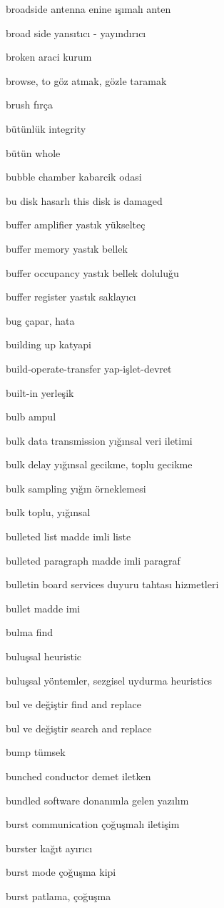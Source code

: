 \documentclass[12pt,fleqn]{article}\usepackage{../../common}
\begin{document}
broadside antenna enine ışımalı anten

broad side yansıtıcı - yayındırıcı

broken araci kurum

browse, to göz atmak, gözle taramak

brush fırça

bütünlük integrity

bütün whole

bubble chamber kabarcik odasi

bu disk hasarlı this disk is damaged

buffer amplifier yastık yükselteç

buffer memory yastık bellek

buffer occupancy yastık bellek doluluğu

buffer register yastık saklayıcı

bug çapar, hata

building up katyapi

build-operate-transfer yap-işlet-devret

built-in yerleşik

bulb ampul

bulk data transmission yığınsal veri iletimi

bulk delay yığınsal gecikme, toplu gecikme

bulk sampling yığın örneklemesi

bulk toplu, yığınsal

bulleted list madde imli liste

bulleted paragraph madde imli paragraf

bulletin board services duyuru tahtası hizmetleri

bullet madde imi

bulma find

buluşsal heuristic

buluşsal yöntemler, sezgisel uydurma heuristics

bul ve değiştir find and replace

bul ve değiştir search and replace

bump tümsek

bunched conductor demet iletken

bundled software donanımla gelen yazılım

burst communication çoğuşmalı iletişim

burster kağıt ayırıcı

burst mode çoğuşma kipi

burst patlama, çoğuşma
\end{document}
